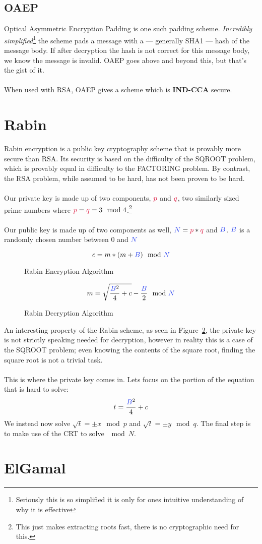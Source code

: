 	\subsection{OAEP}
		Optical Asymmetric Encryption Padding is one such padding scheme. \textit{Incredibly simplified}\footnote{Seriously this is so simplified it is only for ones intuitive understanding of why it is effective} the scheme pads a message with a --- generally SHA1 --- hash of the message body. If after decryption the hash is not correct for this message body, we know the message is invalid. OAEP goes above and beyond this, but that's the gist of it.\\
		\\
		When used with RSA, OAEP gives a scheme which is \textbf{IND-CCA} secure.


\section{Rabin}
	Rabin encryption is a public key cryptography scheme that is provably more secure than RSA. Its security is based on the difficulty of the SQROOT problem, which is provably equal in difficulty to the FACTORING problem. By contrast, the RSA problem, while assumed to be hard, has not been proven to be hard.\\
	\\
	Our private key is made up of two components, $\textcolor{R}{p}$ and $\textcolor{R}{q}$, two similarly sized prime numbers where $\textcolor{R}{p} = \textcolor{R}{q} = 3 \mod 4$.\footnote{This just makes extracting roots fast, there is no cryptographic need for this.}\\
	\\
	Our public key is made up of two components as well, $\textcolor{B}{N} = \textcolor{R}{p}*\textcolor{R}{q}$ and $\textcolor{B}{B}$. $\textcolor{B}{B}$ is a randomly chosen number between $0$ and $\textcolor{B}{N}$\\
  \begin{figure}[htp!]
		$$c = m * (m + \textcolor{B}{B}) \mod \textcolor{B}{N}$$
  \caption{Rabin Encryption Algorithm}
  \label{fig:rabin-enc}
  \end{figure}

  \begin{figure}[htp!]
		$$m = \sqrt{\frac{\textcolor{B}{B}^2}{4}+c} - \frac{\textcolor{B}{B}}{2} \mod \textcolor{B}{N}$$
  \caption{Rabin Decryption Algorithm}
  \label{fig:rabin-dec}
  \end{figure}
	An interesting property of the Rabin scheme, as seen in Figure~\ref{fig:rabin-dec}, the private key is not strictly speaking needed for decryption, however in reality this is a case of the SQROOT problem; even knowing the contents of the square root, finding the square root is not a trivial task.\\
	\\
	This is where the private key comes in. Lets focus on the portion of the equation that is hard to solve:
	$$t = \frac{\textcolor{B}{B}^2}{4}+c$$
	We instead now solve $\sqrt{t} = \pm x\mod p $ and $\sqrt{t} = \pm y \mod q$. The final step is to make use of the CRT to solve $\mod N$. %


\section{ElGamal}